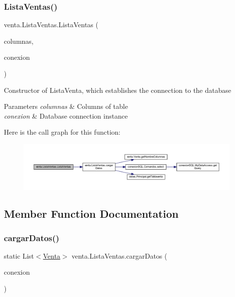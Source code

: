 \subsubsection{\texorpdfstring{Lista\+Ventas()}{ListaVentas()}}
{\footnotesize\ttfamily venta.\+Lista\+Ventas.\+Lista\+Ventas (\begin{DoxyParamCaption}\item[{\mbox{\hyperlink{classventa_1_1_modelo_columnas_tabla_venta}{Modelo\+Columnas\+Tabla\+Venta}}}]{columnas,  }\item[{\mbox{\hyperlink{classconexion_s_q_l_1_1_my_data_access}{My\+Data\+Access}}}]{conexion }\end{DoxyParamCaption})}

Constructor of Lista\+Venta, which establishes the connection to the database 
\begin{DoxyParams}{Parameters}
{\em columnas} & Columns of table \\
\hline
{\em conexion} & Database connection instance \\
\hline
\end{DoxyParams}
Here is the call graph for this function\+:
\nopagebreak
\begin{figure}[H]
\begin{center}
\leavevmode
\includegraphics[width=350pt]{classventa_1_1_lista_ventas_a69da326fde1b9ceea242d38147016528_cgraph}
\end{center}
\end{figure}


\subsection{Member Function Documentation}
\mbox{\label{classventa_1_1_lista_ventas_a5addbb3cc5ae30ddd938cc5ae3021a48}} 
\subsubsection{\texorpdfstring{cargar\+Datos()}{cargarDatos()}}
{\footnotesize\ttfamily static List$<$\mbox{\hyperlink{classventa_1_1_venta}{Venta}}$>$ venta.\+Lista\+Ventas.\+cargar\+Datos (\begin{DoxyParamCaption}\item[{\mbox{\hyperlink{classconexion_s_q_l_1_1_my_data_access}{My\+Data\+Access}}}]{conexion }\end{DoxyParamCaption})\hspace{0.3cm}{\ttfamily [static]}}

